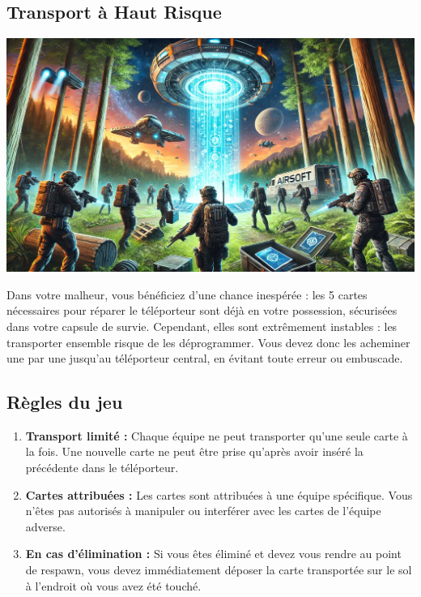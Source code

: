 \documentclass{template}
\begin{document}
\subsection{Transport à Haut Risque}  %

\begin{minipage}[t]{0.48\textwidth}
    \vspace{0em}
    \includegraphics[width=\linewidth]{docs/img/variante1.png}
\end{minipage}
\hfill
\begin{minipage}[t]{0.48\textwidth}
    Dans votre malheur, vous bénéficiez d’une chance inespérée : les 5 cartes nécessaires pour réparer le téléporteur sont déjà en votre possession, sécurisées dans votre capsule de survie. Cependant, elles sont extrêmement instables : les transporter ensemble risque de les déprogrammer. Vous devez donc les acheminer une par une jusqu’au téléporteur central, en évitant toute erreur ou embuscade.
\end{minipage}

\subsection*{Règles du jeu}

\begin{enumerate}
    \item \textbf{Transport limité :} Chaque équipe ne peut transporter qu’une seule carte à la fois. Une nouvelle carte ne peut être prise qu’après avoir inséré la précédente dans le téléporteur.
    \item \textbf{Cartes attribuées :} Les cartes sont attribuées à une équipe spécifique. Vous n’êtes pas autorisés à manipuler ou interférer avec les cartes de l’équipe adverse.
    \item \textbf{En cas d’élimination :} Si vous êtes éliminé et devez vous rendre au point de respawn, vous devez immédiatement déposer la carte transportée sur le sol à l’endroit où vous avez été touché. 
\end{enumerate}
\end{document}
